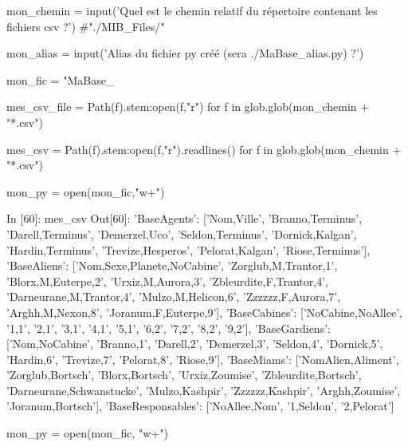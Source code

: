 \documentclass[french]{beamer}
\begin{document}
\begin{frame}[fragile]
\begin{pythoncode}
mon_chemin = input('Quel est le chemin relatif du répertoire contenant les fichiers csv ?\n')
#"./MIB_Files/"

mon_alias = input('Alias du fichier py créé (sera ./MaBase_alias.py) ?\n')

mon_fic = "MaBase_%
 
mes_csv_file = {Path(f).stem:open(f,"r") for f in glob.glob(mon_chemin + "*.csv")}

mes_csv = {Path(f).stem:open(f,"r").readlines() for f in glob.glob(mon_chemin + "*.csv")}

mon_py = open(mon_fic,"w+")
\end{pythoncode}
\end{frame}




\begin{frame}[fragile]
\begin{pythoncode}
In [60]: mes_csv
Out[60]: 
{'BaseAgents': ['Nom,Ville\n',
  'Branno,Terminus\n',
  'Darell,Terminus\n',
  'Demerzel,Uco\n',
  'Seldon,Terminus\n',
  'Dornick,Kalgan\n',
  'Hardin,Terminus\n',
  'Trevize,Hesperos\n',
  'Pelorat,Kalgan\n',
  'Riose,Terminus\n'],
 'BaseAliens': ['Nom,Sexe,Planete,NoCabine\n',
  'Zorglub,M,Trantor,1\n',
  'Blorx,M,Euterpe,2\n',
  'Urxiz,M,Aurora,3\n',
  'Zbleurdite,F,Trantor,4\n',
  'Darneurane,M,Trantor,4\n',
  'Mulzo,M,Helicon,6\n',
  'Zzzzzz,F,Aurora,7\n',
  'Arghh,M,Nexon,8\n',
  'Joranum,F,Euterpe,9\n'],
 'BaseCabines': ['NoCabine,NoAllee\n',
  '1,1\n',
  '2,1\n',
  '3,1\n',
  '4,1\n',
  '5,1\n',
  '6,2\n',
  '7,2\n',
  '8,2\n',
  '9,2\n'],
 'BaseGardiens': ['Nom,NoCabine\n',
  'Branno,1\n',
  'Darell,2\n',
  'Demerzel,3\n',
  'Seldon,4\n',
  'Dornick,5\n',
  'Hardin,6\n',
  'Trevize,7\n',
  'Pelorat,8\n',
  'Riose,9\n'],
 'BaseMiams': ['NomAlien,Aliment\n',
  'Zorglub,Bortsch\n',
  'Blorx,Bortsch\n',
  'Urxiz,Zoumise\n',
  'Zbleurdite,Bortsch\n',
  'Darneurane,Schwanstucke\n',
  'Mulzo,Kashpir\n',
  'Zzzzzz,Kashpir\n',
  'Arghh,Zoumise\n',
  'Joranum,Bortsch\n'],
 'BaseResponsables': ['NoAllee,Nom\n', '1,Seldon\n', '2,Pelorat\n']}
\end{pythoncode}


\end{frame}


\begin{frame}[fragile]
\begin{pythoncode}
mon_py = open(mon_fic, "w+")
\end{pythoncode}


  

\end{frame}
\end{document}
